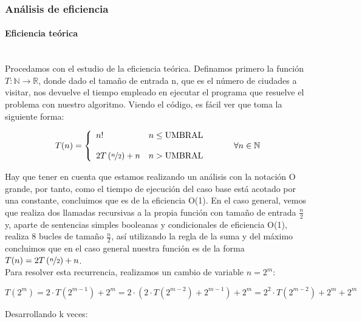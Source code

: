 \documentclass{article}
\newcommand{\myparagraph}[1]{\paragraph{#1}\mbox{}\\}
\newcommand\N{\ensuremath{\mathbb N}\space}
\begin{document}
%

\subsubsection{Análisis de eficiencia} %

\myparagraph{Eficiencia teórica}

    Procedamos con el estudio de la eficiencia teórica. Definamos primero la función $T: \mathbb{N} \rightarrow \mathbb{R}$, donde dado el tamaño de entrada n, que es el número de ciudades a visitar, nos devuelve el tiempo empleado en ejecutar el programa que resuelve el problema con nuestro algoritmo. Viendo el código, es fácil ver 
    que toma la siguiente forma:

    \begin{equation} \label{eq:ef_dyv_p1}
    T(n) = \left\{ \begin{array}{lcc} n! & n \leq \text{UMBRAL}  \\ \\ 
    2T\left(\nicefrac{n}{2}\right) + n &  n > \text{UMBRAL}  \\ \end{array} \right. \hspace{10mm} \forall n \in \N
    \end{equation}

    Hay que tener en cuenta que estamos realizando un análisis con la notación O grande, por tanto, como el tiempo de ejecución del caso base está acotado por una constante, concluimos que es de la eficiencia O(1).
    En el caso general, vemos que realiza dos llamadas recursivas a la propia función con tamaño de entrada $\frac{n}{2}$ y, aparte de sentencias simples booleanas y condicionales de eficiencia O(1), realiza 8 bucles de tamaño $\frac{n}{2}$, 
    así utilizando la regla de la suma y del máximo concluimos que en el caso general nuestra función es de la forma $T(n) = 2T\left(\nicefrac{n}{2}\right) + n$. \\
    
    Para resolver esta recurrencia, realizamos un cambio de variable $n = 2^{m}$:

    \[
        T\left(2^{m}\right) = 2 \cdot T\left(2^{m-1}\right) + 2^{m} = 2 \cdot \left(2 \cdot T\left(2^{m-2}\right) + 2^{m-1}\right) + 2^{m} = 2^{2} \cdot T\left(2^{m-2}\right) + 2^{m} + 2^{m}
    \]

    Desarrollando k veces:
    
\end{document}
